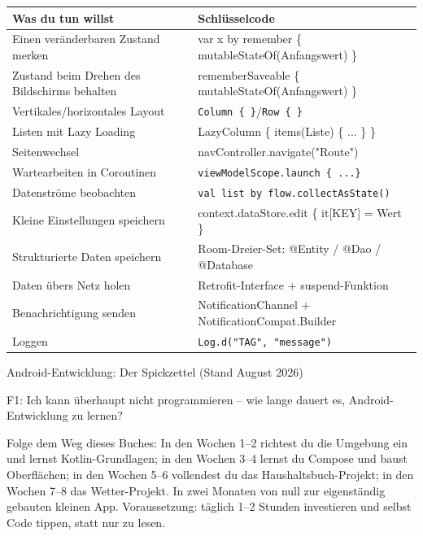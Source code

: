 


\begin{center}
\begin{tabularx}{\linewidth}{|X|X|}
\hline
\textbf{Was du tun willst} & \textbf{Schlüsselcode} \tabularnewline
\hline
Einen veränderbaren Zustand merken & var x by remember \{ mutableStateOf(Anfangswert) \} \tabularnewline
Zustand beim Drehen des Bildschirms behalten & rememberSaveable \{ mutableStateOf(Anfangswert) \} \tabularnewline
Vertikales/horizontales Layout & \texttt{Column \{ \}}/\texttt{Row \{ \}} \tabularnewline
Listen mit Lazy Loading & LazyColumn \{ items(Liste) \{ ... \} \} \tabularnewline
Seitenwechsel & navController.navigate("Route") \tabularnewline
Wartearbeiten in Coroutinen & \texttt{viewModelScope.\allowbreak launch \{ .\allowbreak .\allowbreak .\allowbreak  \}} \tabularnewline
Datenströme beobachten & \texttt{val list by flow.\allowbreak collectAsState()} \tabularnewline
Kleine Einstellungen speichern & context.dataStore.edit \{ it[KEY] = Wert \} \tabularnewline
Strukturierte Daten speichern & Room-Dreier-Set: @Entity / @Dao / @Database \tabularnewline
Daten übers Netz holen & Retrofit-Interface + suspend-Funktion \tabularnewline
Benachrichtigung senden & NotificationChannel + NotificationCompat.Builder \tabularnewline
Loggen & \texttt{Log.\allowbreak d("TAG", "message")} \tabularnewline
\hline
\end{tabularx}
\end{center}

\begin{center}\small\color{gray}Android-Entwicklung: Der Spickzettel (Stand August 2026)\end{center}


F1: Ich kann überhaupt nicht programmieren – wie lange dauert es, Android-Entwicklung zu lernen?

Folge dem Weg dieses Buches: In den Wochen 1–2 richtest du die Umgebung ein und lernst Kotlin-Grundlagen; in den Wochen 3–4 lernst du Compose und baust Oberflächen; in den Wochen 5–6 vollendest du das Haushaltsbuch-Projekt; in den Wochen 7–8 das Wetter-Projekt. In zwei Monaten von null zur eigenständig gebauten kleinen App. Voraussetzung: täglich 1–2 Stunden investieren und selbst Code tippen, statt nur zu lesen.

